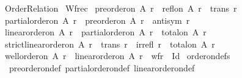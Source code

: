 %
\begin{isabellebody}%
%
%
\isadelimdocument
%
\endisadelimdocument
%
\isatagdocument
%
\isamarkuptrue%
%
\endisatagdocument
{\isafolddocument}%
%
\isadelimdocument
%
\endisadelimdocument
%
\isadelimtheory
%
\endisadelimtheory
%
\isatagtheory
{}\isamarkupfalse%
\ Order{\isacharunderscore}{\kern0pt}Relation\isanewline
{}\ Wfrec\isanewline
{}%
\endisatagtheory
{\isafoldtheory}%
%
\isadelimtheory
%
\endisadelimtheory
%
\isadelimdocument
%
\endisadelimdocument
%
\isatagdocument
%
\isamarkuptrue%
%
\endisatagdocument
{\isafolddocument}%
%
\isadelimdocument
%
\endisadelimdocument
{}\isamarkupfalse%
\ {\isachardoublequoteopen}preorder{\isacharunderscore}{\kern0pt}on\ A\ r\ {\isasymequiv}\ refl{\isacharunderscore}{\kern0pt}on\ A\ r\ {\isasymand}\ trans\ r{\isachardoublequoteclose}\isanewline
\isanewline
{}\isamarkupfalse%
\ {\isachardoublequoteopen}partial{\isacharunderscore}{\kern0pt}order{\isacharunderscore}{\kern0pt}on\ A\ r\ {\isasymequiv}\ preorder{\isacharunderscore}{\kern0pt}on\ A\ r\ {\isasymand}\ antisym\ r{\isachardoublequoteclose}\isanewline
\isanewline
{}\isamarkupfalse%
\ {\isachardoublequoteopen}linear{\isacharunderscore}{\kern0pt}order{\isacharunderscore}{\kern0pt}on\ A\ r\ {\isasymequiv}\ partial{\isacharunderscore}{\kern0pt}order{\isacharunderscore}{\kern0pt}on\ A\ r\ {\isasymand}\ total{\isacharunderscore}{\kern0pt}on\ A\ r{\isachardoublequoteclose}\isanewline
\isanewline
{}\isamarkupfalse%
\ {\isachardoublequoteopen}strict{\isacharunderscore}{\kern0pt}linear{\isacharunderscore}{\kern0pt}order{\isacharunderscore}{\kern0pt}on\ A\ r\ {\isasymequiv}\ trans\ r\ {\isasymand}\ irrefl\ r\ {\isasymand}\ total{\isacharunderscore}{\kern0pt}on\ A\ r{\isachardoublequoteclose}\isanewline
\isanewline
{}\isamarkupfalse%
\ {\isachardoublequoteopen}well{\isacharunderscore}{\kern0pt}order{\isacharunderscore}{\kern0pt}on\ A\ r\ {\isasymequiv}\ linear{\isacharunderscore}{\kern0pt}order{\isacharunderscore}{\kern0pt}on\ A\ r\ {\isasymand}\ wf{\isacharparenleft}{\kern0pt}r\ {\isacharminus}{\kern0pt}\ Id{\isacharparenright}{\kern0pt}{\isachardoublequoteclose}\isanewline
\isanewline
{}\isamarkupfalse%
\ order{\isacharunderscore}{\kern0pt}on{\isacharunderscore}{\kern0pt}defs\ {\isacharequal}{\kern0pt}\isanewline
\ \ preorder{\isacharunderscore}{\kern0pt}on{\isacharunderscore}{\kern0pt}def\ partial{\isacharunderscore}{\kern0pt}order{\isacharunderscore}{\kern0pt}on{\isacharunderscore}{\kern0pt}def\ linear{\isacharunderscore}{\kern0pt}order{\isacharunderscore}{\kern0pt}on{\isacharunderscore}{\kern0pt}def\isanewline

\end{isabellebody}
